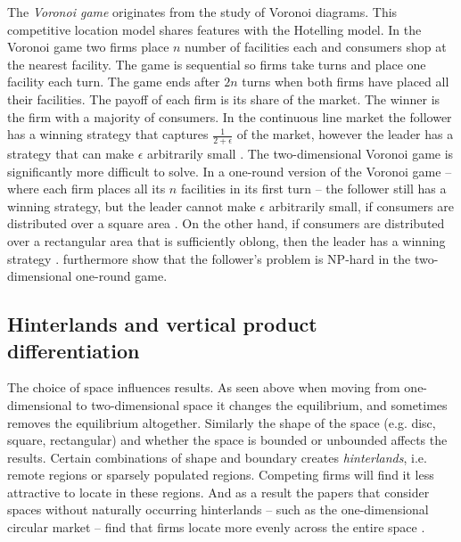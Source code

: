 \documentclass[preprint, 12pt]{elsarticle}
\begin{document}
The \emph{Voronoi game} originates from the study of Voronoi diagrams. This competitive location model shares features with the Hotelling model. In the Voronoi game two firms place $n$ number of facilities each and consumers shop at the nearest facility. The game is sequential so firms take turns and place one facility each turn. The game ends after $2n$ turns when both firms have placed all their facilities. The payoff of each firm is its share of the market. The winner is the firm with a majority of consumers. In the continuous line market the follower has a winning strategy that captures $\frac{1}{2+\epsilon}$ of the market, however the leader has a strategy that can make $\epsilon$ arbitrarily small \citep{Ahn_Cheng_Cheong_2001}. The two-dimensional Voronoi game is significantly more difficult to solve. In a one-round version of the Voronoi game -- where each firm places all its $n$ facilities in its first turn -- the follower still has a winning strategy, but the leader cannot make $\epsilon$ arbitrarily small, if consumers are distributed over a square area \citep[chapter~9]{Eiselt_Marianov_2011}. On the other hand, if consumers are distributed over a rectangular area that is sufficiently oblong, then the leader has a winning strategy \citep{Fekete_Meijer_2005}. \citet{Fekete_Meijer_2005} furthermore show that the follower's problem is NP-hard in the two-dimensional one-round game.

\subsection{Hinterlands and vertical product differentiation}

The choice of space influences results. As seen above when moving from one-dimensional to two-dimensional space it changes the equilibrium, and sometimes removes the equilibrium altogether. Similarly the shape of the space (e.g. disc, square, rectangular) and whether the space is bounded or unbounded affects the results. Certain combinations of shape and boundary creates \emph{hinterlands}, i.e. remote regions or sparsely populated regions. Competing firms will find it less attractive to locate in these regions. And as a result the papers that consider spaces without naturally occurring hinterlands -- such as the one-dimensional circular market -- find that firms locate more evenly across the entire space \citep{Eaton_Lipsey_1975, Salop_1979}.
\end{document}

